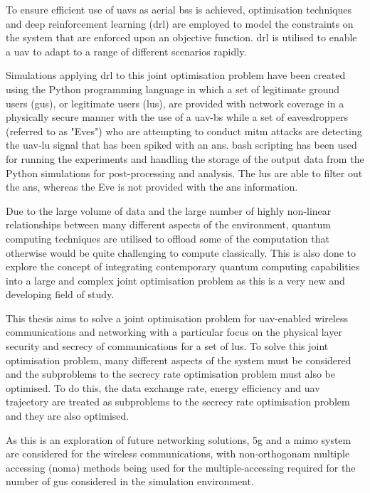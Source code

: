 To ensure efficient use of \acrshort{uav}s as aerial \acrshort{bs}s is achieved, optimisation techniques and deep reinforcement learning (\acrshort{drl}) are employed to model the constraints on the system that are enforced upon an objective function. 
\acrshort{drl} is utilised to enable a \acrshort{uav} to adapt to a range of different scenarios rapidly. 

Simulations applying \acrshort{drl} to this joint optimisation problem have been created using the Python programming language  in which a set of legitimate ground users (\acrshort{gu}s), or legitimate users (\acrshort{lu}s), are provided with network coverage in a physically secure manner with the use of a \acrshort{uav}-\acrshort{bs} while a set of eavesdroppers (referred to as "Eves") who are attempting to conduct \acrfull{mitm} attacks are detecting the \acrshort{uav}-\acrshort{lu} signal that has been spiked with an \acrfull{ans}. 
\acrfull{bash} scripting has been used for running the experiments and handling the storage of the output data from the Python simulations for post-processing and analysis. 
The \acrshort{lu}s are able to filter out the \acrshort{ans}, whereas the Eve is not provided with the \acrshort{ans} information. 

Due to the large volume of data and the large number of highly non-linear relationships between many different aspects of the environment, quantum computing techniques are utilised to offload some of the computation that otherwise would be quite challenging to compute classically. 
This is also done to explore the concept of integrating contemporary quantum computing capabilities into a large and complex joint optimisation problem as this is a very new and developing field of study. 

This thesis aims to solve a joint optimisation problem for \acrshort{uav}-enabled wireless communications and networking with a particular focus on the physical layer security and secrecy of communications for a set of \acrshort{lu}s. 
To solve this joint optimisation problem, many different aspects of the system must be considered and the subproblems to the secrecy rate optimisation problem must also be optimised. 
To do this, the data exchange rate, energy efficiency and \acrshort{uav} trajectory are treated as subproblems to the secrecy rate optimisation problem and they are also optimised. 

As this is an exploration of future networking solutions, \acrfull{5g} and a \acrfull{mimo} system are considered for the wireless communications, with non-orthogonam multiple accessing (\acrshort{noma}) methods being used for the multiple-accessing required for the number of \acrshort{gu}s considered in the simulation environment. 